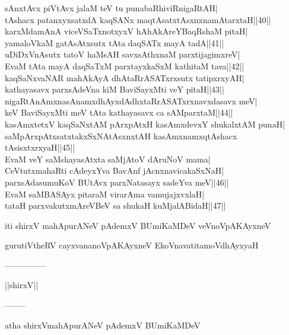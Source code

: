 \documentclass{article}
\begin{document}
sAnxtAvx piVtAvx jalaM teV tu punabaRhiviRnigaRtAH|\\
tAshacx patanxyxsatxdA kaqSANx maqtAsatxtAsxnxnamAtarxtaH||40||\\
karxMdamAnA viceVSaTxnotxyxV hAhAkAreYBaqRshaM pitaH|\\
yamaloVkaM gatAsAtxsutx tAta daqSATx mayA tadA||41||\\
uDiDxVnAsutx tatoV haMsAH savxsAthxnaM parxtijagimxreV|\\
EvaM tAta mayA daqSaTxM parxtayxkaSxM kathitaM tava||42||\\
kaqSaNxvaNAR mahAkAyA dhAtaRrASATxrxsutx tatipxrxyAH|\\
kathayasavx parxsAdeVna kiM BaviSayxMti veY pitaH||43||\\
nigaRtAnAmxnasAnamxdhAyxdAdhxtaRrASATxrxnavxdasavx meV|\\
keV BaviSayxMti meV tAta kathayasavx ca sAMparxtaM||44||\\
kasAmxtetxV kaqSaNxtAM pArxpAtxH kasAmxdevxY shukalxtAM punaH|\\
saMpArxpAtxsatxtakxSxNAtAsxnxtAH kasAmxnamxqtAshacx tAsisxtxrxyaH||45||\\
EvaM veY saMshayasAtxta saMjAtoV dAruNoV mama|\\
CeVtutxmahaRti cAdeyxYva BavAnf jAcnxnavicakaSxNaH|\\
parxsAdasumuKoV BUtAvx parxNatasayx sadeYva meV||46||\\
EvaM saMBASAyx pitaraM virarAma vamujajxvxlaH|\\
tataH parxvakutxmAreVBeV sa shukaH kuMjalABidaH||47||

\begin{center}
iti shirxV mahApurANeV pAdemxV BUmiKaMDeV veVnoVpAKAyxneV
\end{center}

\begin{center}
gurutiVtheRV cayxvananoVpAKAyxneV EkoVnavatitamoVdhAyxyaH
\end{center}

\begin{center}
---------------
\end{center}

\begin{center}
||shirxV||
\end{center}

\begin{center}
--------
\end{center}

\begin{center}
atha shirxVmahApurANeV pAdemxV BUmiKaMDeV
\end{center}
\end{document}
